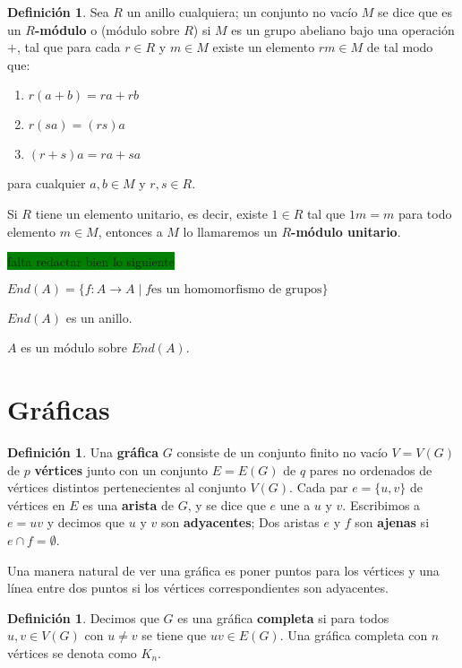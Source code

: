\documentclass[12pt]{book}
\theoremstyle{definition}
\newtheorem{definition}[theorem]{Definición}
\newcounter{in}
\newcounter{ini}
\begin{document}
\begin{definition}
  Sea $R$ un anillo cualquiera; un conjunto no vacío $M$ se dice que
  es un \textbf{$R$-módulo} o (módulo sobre $R$) si $M$ es un grupo abeliano
  bajo una operación $+$, tal que para cada $r\in R$ y $m\in M$ existe
  un elemento $rm\in M$ de tal modo que:
  \begin{enumerate}
  \item $r(a+b)=ra+rb$
  \item $r(sa)=(rs)a$
  \item $(r+s)a=ra+sa$
  \end{enumerate}
  para cualquier $a,b \in M$ y $r,s\in R$.

  Si $R$ tiene un elemento unitario, es decir, existe $1\in R$ tal que $1m=m$ para todo elemento
  $m\in M$, entonces a $M$ lo llamaremos un \textbf{$R$-módulo
  unitario}.
\end{definition}
{\setlength{\fboxsep}{0pt}\colorbox{green}{falta redactar bien lo
    siguiente}}

$End(A)=\{f:A\rightarrow A\mid f\mbox{es un homomorfismo de grupos}\}$

$End(A)$ es un anillo.

$A$ es un módulo sobre $End(A)$.

\section{Gráficas}
\label{graficas}

\begin{definition}
  Una \textbf{gráfica} $G$ consiste de un conjunto finito no vacío $V=V(G)$
  de $p$ \textbf{vértices} junto con un conjunto $E=E(G)$ de $q$ pares no
  ordenados de vértices distintos pertenecientes al conjunto $V(G)$. Cada par $e=\{u,v\}$ de vértices
  en $E$ es una \textbf{arista} de $G$, y se dice que $e$ une a $u$ y
  $v$. Escribimos a $e=uv$ y decimos que $u$ y $v$ son \textbf{adyacentes};
  Dos aristas $e$ y $f$ son \textbf{ajenas} si $e\cap f=\emptyset$.

  Una manera natural de ver una gráfica es poner puntos para los
  vértices y una línea entre dos puntos si los vértices correspondientes
  son adyacentes.
\end{definition}

\begin{definition}
  Decimos que $G$ es una gráfica \textbf{completa} si para
  todos~$u,v\in V(G)$ con $u\neq v$ se tiene que $uv\in E(G)$. Una gráfica completa con
  $n$ vértices se denota como $K_{n}$.
\end{definition}
\end{document}
